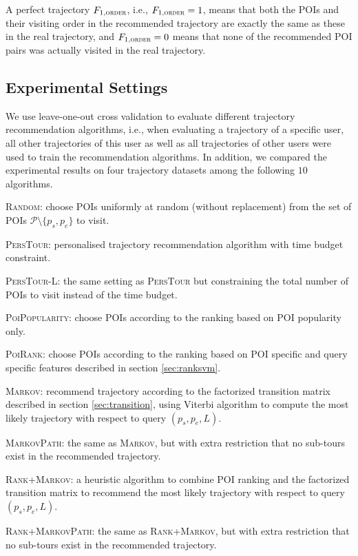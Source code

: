 A perfect trajectory $F_{1,\textsc{order}}$, i.e., $F_{1,\textsc{order}} = 1$, means that both the POIs and their visiting order in the
recommended trajectory are exactly the same as these in the real trajectory,
and $F_{1,\textsc{order}} = 0$ means that none of the recommended POI pairs was actually visited in the real trajectory.


\subsection{Experimental Settings}
We use leave-one-out cross validation to evaluate different trajectory recommendation algorithms,
i.e., when evaluating a trajectory of a specific user, all other trajectories of this user as well as
all trajectories of other users were used to train the recommendation algorithms.
In addition, we compared the experimental results on four trajectory datasets among the following $10$ algorithms.

\textsc{Random}: choose POIs uniformly at random (without replacement)
    from the set of POIs $\mathcal{P} \setminus \{p_s, p_e \}$ to visit.

\textsc{PersTour}\cite{ijcai15}: personalised trajectory recommendation algorithm with time budget constraint.

\textsc{PersTour-L}: the same setting as \textsc{PersTour} but constraining the total number of POIs to visit
    instead of the time budget.

\textsc{PoiPopularity}: choose POIs according to the ranking based on POI popularity only.

\textsc{PoiRank}: choose POIs according to the ranking based on POI specific and query specific features
    described in section \ref{sec:ranksvm}.

\textsc{Markov}: recommend trajectory according to the factorized transition matrix described in section \ref{sec:transition},
    using Viterbi algorithm to compute the most likely trajectory with respect to query $(p_s, p_e, L)$.

\textsc{MarkovPath}: the same as \textsc{Markov}, but with extra restriction that no sub-tours exist in the
    recommended trajectory.

\textsc{Rank+Markov}: a heuristic algorithm to combine POI ranking and the factorized transition matrix
    to recommend the most likely trajectory with respect to query $(p_s, p_e, L)$.

\textsc{Rank+MarkovPath}: the same as \textsc{Rank+Markov}, but with extra restriction that no sub-tours exist in
    the recommended trajectory.

